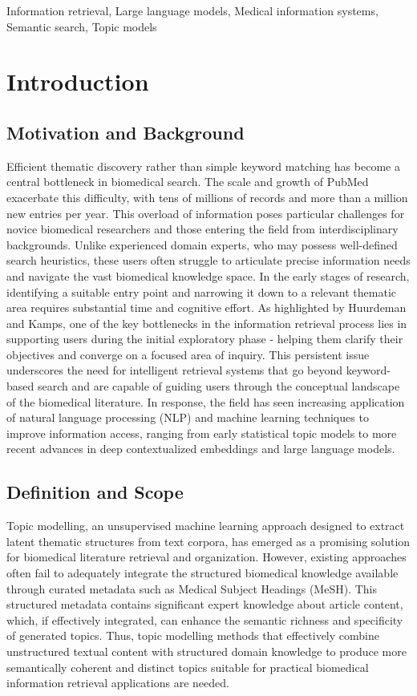 \documentclass[authorproof,JACIII,researchpaper]{fujipressarticle}
\begin{document}
\begin{keywords}
Information retrieval, Large language models, Medical information systems, Semantic search, Topic models
\end{keywords}


\section{Introduction}
\label{sec:introduction}
\subsection{Motivation and Background}
Efficient thematic discovery rather than simple keyword matching has become a central bottleneck in biomedical search. The scale and growth of PubMed exacerbate this difficulty, with tens of millions of records and more than a million new entries per year\cite{jin_pubmed_2024}.
This overload of information poses particular challenges for novice biomedical researchers and those entering the field from interdisciplinary backgrounds. Unlike experienced domain experts, who may possess well-defined search heuristics, these users often struggle to articulate precise information needs and navigate the vast biomedical knowledge space. In the early stages of research, identifying a suitable entry point and narrowing it down to a relevant thematic area requires substantial time and cognitive effort. As highlighted by Huurdeman and Kamps\cite{fu_designing_2020}, one of the key bottlenecks in the information retrieval process lies in supporting users during the initial exploratory phase - helping them clarify their objectives and converge on a focused area of inquiry. This persistent issue underscores the need for intelligent retrieval systems that go beyond keyword-based search and are capable of guiding users through the conceptual landscape of the biomedical literature. In response, the field has seen increasing application of natural language processing (NLP) and machine learning techniques to improve information access, ranging from early statistical topic models to more recent advances in deep contextualized embeddings and large language models.

\subsection{Definition and Scope}
Topic modelling, an unsupervised machine learning approach designed to extract latent thematic structures from text corpora, has emerged as a promising solution for biomedical literature retrieval and organization. However, existing approaches often fail to adequately integrate the structured biomedical knowledge available through curated metadata such as Medical Subject Headings (MeSH). This structured metadata contains significant expert knowledge about article content, which, if effectively integrated, can enhance the semantic richness and specificity of generated topics. Thus, topic modelling methods that effectively combine unstructured textual content with structured domain knowledge to produce more semantically coherent and distinct topics suitable for practical biomedical information retrieval applications are needed.
\end{document}
